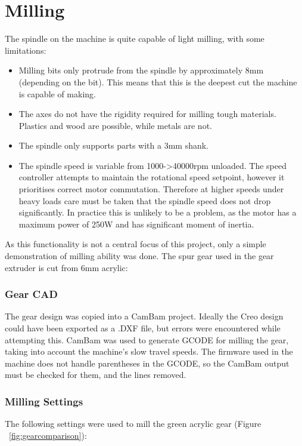 \section{Milling}
The spindle on the machine is quite capable of light milling, with some limitations:

\begin{itemize} \itemsep0em
	\item	Milling bits only protrude from the spindle by approximately 8mm (depending on the bit). This means that this is the deepest cut the machine is capable of making.
	\item	The axes do not have the rigidity required for milling tough materials. Plastics and wood are possible, while metals are not.
	\item	The spindle only supports parts with a 3mm shank.
	\item	The spindle speed is variable from 1000-\textgreater40000rpm unloaded. The speed controller attempts to maintain the rotational speed setpoint, however it prioritises
			correct motor commutation. Therefore at higher speeds under heavy loads care must be taken that the spindle speed does not drop significantly. In practice this is unlikely
			to be a problem, as the motor has a maximum power of 250W and has significant moment of inertia.
\end{itemize}

As this functionality is not a central focus of this project, only a simple demonstration of milling ability was done. The spur gear used in the gear extruder is cut from 6mm acrylic:

\subsubsection {Gear CAD}
The gear design was copied into a CamBam project. Ideally the Creo design could have been exported as a .DXF file, but errors were encountered while attempting this. CamBam was used to 
generate GCODE for milling the gear, taking into account the machine's slow travel speeds. The firmware used in the machine does not handle parentheses in the GCODE, so the CamBam 
output must be checked for them, and the lines removed.

\subsubsection {Milling Settings}

The following settings were used to mill the green acrylic gear (Figure ~\ref{fig:gearcomparison}):

